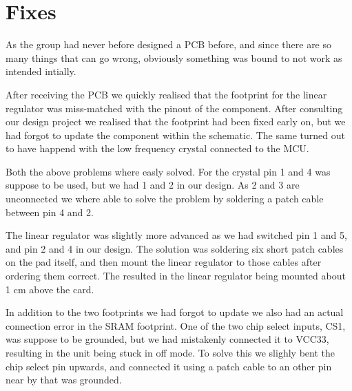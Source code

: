 
\section{Fixes}

As the group had never before designed a PCB before, and since there are so
many things that can go wrong, obviously something was bound to not 
work as intended intially.

After receiving the PCB we quickly realised that the footprint for the 
linear regulator was miss-matched with the pinout of the component. 
After consulting our design project we realised that the footprint had
been fixed early on, but we had forgot to update the component within 
the schematic. The same turned out to have happend with the low frequency
crystal connected to the MCU.

Both the above problems where easly solved. For the crystal pin 1 and 4
was suppose to be used, but we had 1 and 2 in our design. As 2 and 3 are 
unconnected we where able to solve the problem by soldering a patch cable
between pin 4 and 2.  

The linear regulator was slightly more advanced as we had switched pin
1 and 5, and pin 2 and 4 in our design. The solution was soldering six 
short patch cables on the pad itself, and then mount the linear regulator
to those cables after ordering them correct. The resulted in the linear 
regulator being mounted about 1 cm above the card. 

In addition to the two footprints we had forgot to update we also had
an actual connection error in the SRAM footprint. One of the two chip
select inputs, CS1, was suppose to be grounded, but we had mistakenly connected
it to VCC33, resulting in the unit being stuck in off mode. To solve
this we slighly bent the chip select pin upwards, and connected it using
a patch cable to an other pin near by that was grounded. 